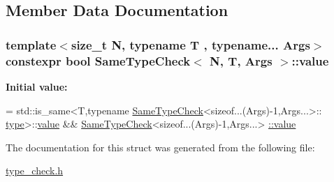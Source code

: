 \subsection{Member Data Documentation}
\hypertarget{struct_same_type_check_a90fe116ef2512e49fc0065e1c9ccf302}{
\subsubsection[{value}]{\setlength{\rightskip}{0pt plus 5cm}template$<$size\-\_\-t N, typename T , typename... Args$>$ constexpr bool {\bf Same\-Type\-Check}$<$ N, T, Args $>$\-::value\hspace{0.3cm}{\ttfamily [static]}}}\label{struct_same_type_check_a90fe116ef2512e49fc0065e1c9ccf302}
{\bfseries Initial value\-:}
\begin{DoxyCode}
= std::is\_same<T,\textcolor{keyword}{typename} \hyperlink{struct_same_type_check}{SameTypeCheck}<\textcolor{keyword}{sizeof}...(Args)-1,Args...>::
      \hyperlink{struct_same_type_check_a2bd1b23b5f7e5f14acc5a64274651adb}{type}>::\hyperlink{struct_same_type_check_a90fe116ef2512e49fc0065e1c9ccf302}{value}
                                  && \hyperlink{struct_same_type_check}{SameTypeCheck}<\textcolor{keyword}{sizeof}...(Args)-1,Args...>
      \hyperlink{struct_same_type_check_a90fe116ef2512e49fc0065e1c9ccf302}{::value}
\end{DoxyCode}


The documentation for this struct was generated from the following file\-:\begin{DoxyCompactItemize}
\item 
\hyperlink{type__check_8h}{type\-\_\-check.\-h}\end{DoxyCompactItemize}
